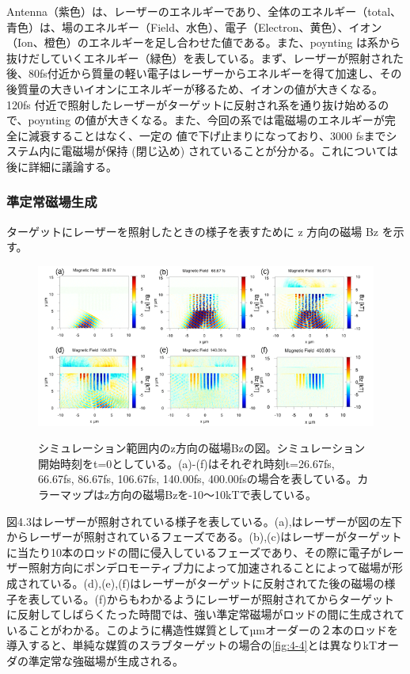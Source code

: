 \documentclass[a4paper,11pt,titlepage]{jarticle}
\numberwithin{equation}{section} %
\begin{document}
  Antenna（紫色）は、レーザーのエネルギーであり、全体のエネルギー（total、青色）は、場のエネルギー（Field、水色）、電子（Electron、黄色）、イオン（Ion、橙色）のエネルギーを足し合わせた値である。また、poynting は系から抜けだしていくエネルギー（緑色）を表している。まず、レーザーが照射された後、80fs付近から質量の軽い電子はレーザーからエネルギーを得て加速し、その後質量の大きいイオンにエネルギーが移るため、イオンの値が大きくなる。120fs 付近で照射したレーザーがターゲットに反射され系を通り抜け始めるので、poynting の値が大きくなる。また、今回の系では電磁場のエネルギーが完全に減衰することはなく、一定の
  値で下げ止まりになっており、3000 fsまでシステム内に電磁場が保持 (閉じ込め) されていることが分かる。これについては後に詳細に議論する。

  \subsubsection{準定常磁場生成}

  ターゲットにレーザーを照射したときの様子を表すために z 方向の磁場 Bz を示す。
  
  \begin{figure}[H]
    \begin{center}
      \includegraphics[scale=0.5]{./image/4-20-10rod.png}
      \label{fig:4-9}
      \caption{シミュレーション範囲内のz方向の磁場Bzの図。シミュレーション開始時刻をt=0としている。(a)-(f)はそれぞれ時刻t=26.67fs, 66.67fs, 86.67fs, 106.67fs, 140.00fs, 400.00fsの場合を表している。カラーマップはz方向の磁場Bzを-10～10kTで表している。}
    \end{center}
  \end{figure}
  図4.3はレーザーが照射されている様子を表している。(a),はレーザーが図の左下からレーザーが照射されているフェーズである。(b),(c)はレーザーがターゲットに当たり10本のロッドの間に侵入しているフェーズであり、その際に電子がレーザー照射方向にポンデロモーティブ力によって加速されることによって磁場が形成されている。(d),(e),(f)はレーザーがターゲットに反射されてた後の磁場の様子を表している。(f)からもわかるようにレーザーが照射されてからターゲットに反射してしばらくたった時間では、強い準定常磁場がロッドの間に生成されていることがわかる。このように構造性媒質としてµmオーダーの２本のロッドを導入すると、単純な媒質のスラブターゲットの場合の\ref*{fig:4-4}とは異なりkTオーダの準定常な強磁場が生成される。
  
\end{document}
